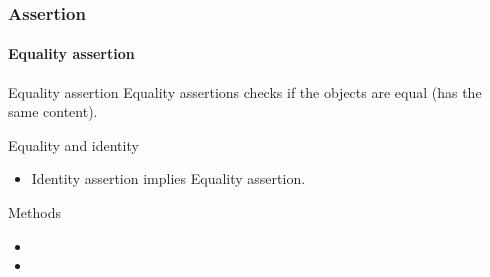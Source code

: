 \begin{frame}[parent={concept:assertion}, hasprev=false, hasnext=false]
\frametitle{Assertion}
\framesubtitle{Equality assertion}
\label{concept:junit-equality-assertion}
\label{concept:equality-assertion}

\begin{block:concept}{Equality assertion}
Equality assertions checks if the objects are equal (has the same content).
\end{block:concept}

\begin{block:fact}{Equality and identity}
\begin{itemize}
	\item Identity assertion implies Equality assertion.
\end{itemize}
\end{block:fact}

\begin{block:fact}{Methods}
\begin{itemize}
	\item {}
	\item {}
\end{itemize}
\end{block:fact}

\hfill
{}
\end{frame}